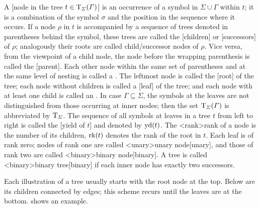 \documentclass[../document.tex]{subfiles}
\begin{document}
    A [node in the tree \(t \in \operatorname{T}_\varSigma(\varGamma)\)] is an occurrence of a symbol in \(\varSigma \cup \varGamma\) within \(t\); it is a combination of the symbol \(\sigma\) and the position in the sequence where it occurs.
    If a node \(\rho\) in \(t\) is accompanied by a sequence of trees denoted in parentheses behind the symbol, these trees are called the [children] or [successors] of \(\rho\); analogously their roots are called child/successor nodes of \(\rho\).
    Vice versa, from the viewpoint of a child node, the node before the wrapping parenthesis is called the [parent].
    Each other node within the same set of parentheses and at the same level of nesting is called a .
    The leftmost node is called the [root] of the tree; each node without children is called a [leaf] of the tree; and each node with at least one child is called an .
    In case \(\varGamma \subseteq \varSigma\), the symbols at the leaves are not distinguished from those occurring at inner nodes; then the set \(\operatorname{T}_\varSigma(\varGamma)\) is abbreviated by \(\operatorname{T}_\varSigma\).
    The sequence of all symbols at leaves in a tree \(t\) from left to right is called the [yield of \(t\)] and denoted by \(\operatorname{yd}(t)\).
    The <rank>{rank of a node} is the number of its children, \(\operatorname{rk}(t)\) denotes the rank of the root in \(t\).
    Each leaf is of rank zero; nodes of rank one are called <unary>{unary node}[unary], and those of rank two are called <binary>{binary node}[binary].
    A tree is called <binary>{binary tree}[binary] if each inner node has exactly two successors.

    Each illustration of a tree usually starts with the root node at the top. Below are its children connected by edges; this scheme recurs until the leaves are at the bottom.
     shows an example.
\end{document}
